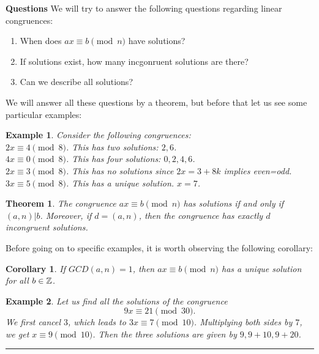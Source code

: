 \documentclass[12pt]{article}
\theoremstyle{plain}
\newtheorem{corollary}{Corollary}
\newtheorem{example}{Example}
\newtheorem{theorem}{Theorem}
\theoremstyle{definition}
\theoremstyle{remark}
\begin{document}
\bigskip
\noindent
{\bf Questions} We will try to answer the following questions regarding linear congruences:
\begin{enumerate}
    \item When does $ax\equiv b \pmod{n}$ have solutions?
    \item If solutions exist, how many incgonruent solutions are there?
    \item Can we describe all solutions?
\end{enumerate}

\bigskip
\noindent
We will answer all these questions by a theorem, but before that let us see some particular examples:
\begin{example}
Consider the following congruences: \\
$2x\equiv 4 \pmod{8}$. This has two solutions: $2, 6$. \\ 
$4x\equiv 0 \pmod{8}$. This has four solutions: $0,2,4,6$. \\
$2x\equiv 3 \pmod{8}$. This has no solutions since $2x=3+8k$ implies even=odd. \\
$3x\equiv 5 \pmod{8}$. This has a unique solution. $x=7$.  
\end{example}

\bigskip
\begin{theorem}
The congruence $ax\equiv b \pmod{n}$ has solutions if and only if $(a,n)|b$. Moreover, if $d=(a,n)$, then the congruence has exactly $d$ incongruent solutions. 
\end{theorem}

\bigskip
\noindent
Before going on to specific examples, it is worth observing the following corollary:
\begin{corollary}
If $GCD(a,n)=1$, then $ax\equiv b \pmod{n}$ has a unique solution for all $b \in \mathbb{Z}$.
\end{corollary}

\bigskip
\begin{example}
Let us find all the solutions of the congruence 
$$9x\equiv 21 \pmod{30}.$$
We first cancel $3$, which leads to $3x\equiv 7 \pmod{10}$. Multiplying both sides by $7$, we get $x\equiv 9 \pmod{10}$. Then the three solutions are given by $9, 9+10, 9+20$. 
\end{example}

\bigskip
\hrule
\end{document}

